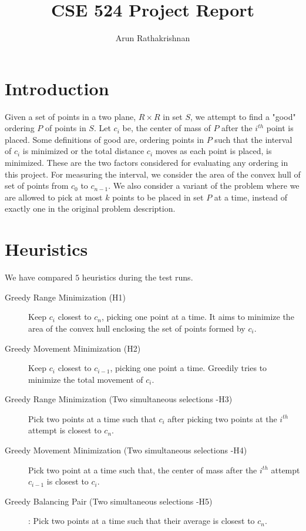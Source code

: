 \documentclass[11pt]{article} %
\title{CSE 524 Project Report}
\author{Arun Rathakrishnan}
\begin{document}
\maketitle

\section{Introduction}
Given a set of points in a two plane, $R \times R$ in set $S$, we attempt to
find a "good" ordering $P$ of points in $S$. Let $c_i$ be, the center of mass
of $P$ after the $i^{th}$ point is placed. Some definitions of good are,
ordering points in $P$ such that the interval of $c_i$ is minimized or the
total distance $c_i$ moves as each point is placed, is minimized. These are the
two factors considered for evaluating any ordering in this project. For
measuring the interval, we consider the area of the convex hull of set of
points from $c_0$ to $c_{n-1}$.  We also consider a variant of the problem
where we are allowed to pick at most $k$ points to be placed in set $P$ at a
time, instead of exactly one in the original problem description.  

\section{Heuristics}
We have compared $5$ heuristics during the test runs.
\begin{description}
\item [Greedy Range Minimization (H1)] Keep $c_i$ closest to $c_n$, picking one point
at a time. It aims to minimize the area of the convex hull enclosing the set of
points formed by $c_i$.
\item [Greedy Movement Minimization (H2)] Keep $c_i$ closest to $c_{i-1}$, picking one
point a time. Greedily tries to minimize the total movement of $c_i$.
\item [Greedy Range Minimization (Two simultaneous selections -H3)] Pick two points
at a time such that $c_i$ after picking two points at the $i^{th}$ attempt is
closest to $c_n$.
\item [Greedy Movement Minimization (Two simultaneous selections -H4)] Pick two point
at a time such that, the center of mass after the $i^{th}$ attempt $c_{i-1}$ is
closest to $c_i$.
\item [Greedy Balancing Pair (Two simultaneous selections -H5)]: Pick two points at a
time such that their average is closest to $c_n$.
\end{description}
\end{document}
